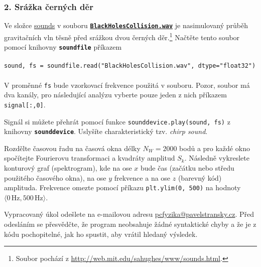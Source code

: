 \documentclass[a4paper,11pt,twoside]{article}
\def\code#1{\textnormal{\texttt{#1}}}
\def\file#1{\textnormal{\textbf{\texttt{#1}}}}
\def\ghfile#1#2{\textnormal{\textbf{\texttt{\href{https://github.com/PavelStransky/PCInPhysics2021/blob/main/#1#2}{#2}}}}}
\begin{document}
\subsubsection*{2. Srážka černých děr}
    Ve složce \href{https://github.com/PavelStransky/PCInPhysics2021/tree/main/sounds}{sounds} v souboru \ghfile{sounds/}{BlackHolesCollision.wav} je nasimulovaný průběh gravitačních vln těsně před srážkou dvou černých děr.\footnote{
        Soubor pochází z \url{http://web.mit.edu/sahughes/www/sounds.html}.
    }
    Načtěte tento soubor pomocí knihovny \file{soundfile} příkazem\\ \\
    \code{sound, fs = soundfile.read("BlackHolesCollision.wav", dtype="float32")}
    \\ \\
    V proměnné \code{fs} bude vzorkovací frekvence použitá v souboru.
    Pozor, soubor má dva kanály, pro následující analýzu vyberte pouze jeden z nich příkazem \code{signal[:,0]}.

    Signál si můžete přehrát pomocí funkce \code{sounddevice.play(sound, fs)} z knihovny \file{sounddevice}.
    Uslyšíte charakteristický tzv. \emph{chirp sound}.
    
    Rozdělte časovou řadu na časová okna délky $N_{W}=2000$ bodů a pro každé okno spočítejte Fourierovu transformaci a kvadráty amplitud $S_{k}$.
    Následně vykreslete konturový graf (spektrogram), kde na ose $x$ bude čas (začátku nebo středu použitého časového okna), na ose $y$ frekvence a na ose $z$ (barevný kód) amplituda.
    Frekvence omezte pomocí příkazu \code{plt.ylim(0, 500)} na hodnoty $\langle 0\,\text{Hz},500\,\text{Hz}\rangle$. 


Vypracovaný úkol odešlete na e-mailovou adresu \href{mailto:pcfyzika@pavelstransky.cz}{pcfyzika@pavelstransky.cz}.
Před odesláním se přesvědčte, že program neobsahuje žádné syntaktické chyby a že je z kódu pochopitelné, jak ho spustit, aby vrátil hledaný výsledek.
\end{document}
